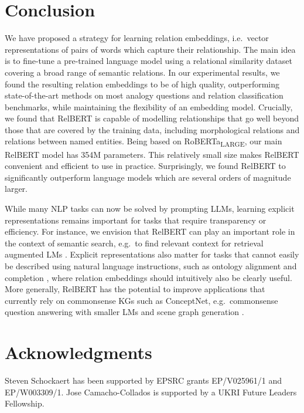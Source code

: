 \documentclass[3p]{elsarticle}
\begin{document}
{\section{Conclusion}
We have proposed a strategy for learning relation embeddings, i.e.\ vector representations of pairs of words which capture their relationship. The main idea is to fine-tune a pre-trained language model using a relational similarity dataset covering a broad range of semantic relations. In our experimental results, we found the resulting relation embeddings to be of high quality, outperforming state-of-the-art methods on most analogy questions and relation classification benchmarks, while maintaining the flexibility of an embedding model. Crucially, we found that RelBERT is capable of modelling relationships that go well beyond those that are covered by the training data, including morphological relations and relations between named entities. Being based on RoBERTa\textsubscript{LARGE}, our main RelBERT model has 354M parameters. This relatively small size makes RelBERT convenient and efficient to use in practice. Surprisingly, we found RelBERT to significantly outperform language models which are several orders of magnitude larger.

While many NLP tasks can now be solved by prompting LLMs, learning explicit representations remains important for tasks that require transparency or efficiency. For instance, we envision that RelBERT can play an important role in the context of semantic search, e.g.\ to find relevant context for retrieval augmented LMs \cite{DBLP:conf/icml/GuuLTPC20}.
Explicit representations also matter for tasks that cannot easily be described using natural language instructions, such as ontology alignment \cite{DBLP:conf/aaai/0008CA022} and completion \cite{DBLP:journals/corr/abs-2202-09791,DBLP:conf/semweb/LiBS19}, where relation embeddings should intuitively also be clearly useful. More generally, RelBERT has the potential to improve applications that currently rely on commonsense KGs such as ConceptNet, e.g.\ commonsense question answering with smaller LMs \cite{yasunaga-etal-2021-qa} and scene graph generation \cite{DBLP:conf/wacv/ChenRL23}.


\section*{Acknowledgments}
Steven Schockaert has been supported by EPSRC grants EP/V025961/1 and EP/W003309/1. Jose Camacho-Collados is supported by a UKRI Future Leaders Fellowship.


}
\end{document}
